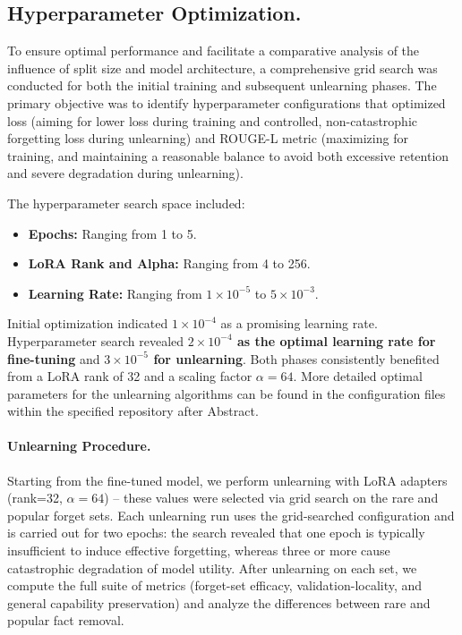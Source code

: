 \documentclass[11pt]{article}
\begin{document}
{\subsection{Hyperparameter Optimization.}
\label{sec:hyperparameters}

To ensure optimal performance and facilitate a comparative analysis of the influence of split size and model architecture, a comprehensive grid search was conducted for both the initial training and subsequent unlearning phases. The primary objective was to identify hyperparameter configurations that optimized loss (aiming for lower loss during training and controlled, non-catastrophic forgetting loss during unlearning) and ROUGE-L metric (maximizing for training, and maintaining a reasonable balance to avoid both excessive retention and severe degradation during unlearning).

The hyperparameter search space included:
\begin{itemize}
    \item \textbf{Epochs:} Ranging from 1 to 5.
    \item \textbf{LoRA Rank and Alpha:} Ranging from 4 to 256.
    \item \textbf{Learning Rate:} Ranging from $1 \times 10^{-5}$ to $5 \times 10^{-3}$.
\end{itemize}

Initial optimization indicated $1 \times 10^{-4}$ as a promising learning rate. Hyperparameter search revealed \textbf{$2 \times 10^{-4}$ as the optimal learning rate for fine-tuning} and \textbf{$3 \times 10^{-5}$ for unlearning}. Both phases consistently benefited from a LoRA rank of 32 and a scaling factor $\alpha = 64$.
More detailed optimal parameters for the unlearning algorithms can be found in the configuration files within the specified repository after Abstract.


\paragraph{Unlearning Procedure.}
Starting from the fine-tuned model, we perform unlearning with LoRA adapters (rank=32, $\alpha=64$) -- these values were selected via grid search on the rare and popular forget sets. Each unlearning run uses the grid-searched configuration and is carried out for two epochs: the search revealed that one epoch is typically insufficient to induce effective forgetting, whereas three or more cause catastrophic degradation of model utility. After unlearning on each set, we compute the full suite of metrics (forget-set efficacy, validation-locality, and general capability preservation) and analyze the differences between rare and popular fact removal.










}
\end{document}
